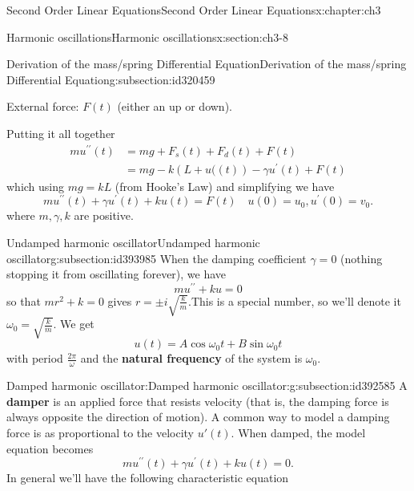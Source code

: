 \documentclass[oneside,10pt,]{book}
\newcommand{\terminology}[1]{\textbf{#1}}
\numberwithin{equation}{section}
\numberwithin{equation}{section}
\newcommand{\amp}{&}
\begin{document}
\begin{chapterptx}{Second Order Linear Equations}{}{Second Order Linear Equations}{}{}{x:chapter:ch3}
\begin{sectionptx}{Harmonic oscillations}{}{Harmonic oscillations}{}{}{x:section:ch3-8}
\begin{subsectionptx}{Derivation of the mass\slash{}spring Differential Equation}{}{Derivation of the mass\slash{}spring Differential Equation}{}{}{g:subsection:id320459}
\par
External force: \(F(t)\) (either an up or down).%
\par
Putting it all together%
\begin{align*}
mu^{\prime\prime}(t) \amp= mg+F_{s}(t)+F_{d}(t)+F(t) \\
\amp= mg-k\left(L+u((t)\right)-\gamma u^{\prime}(t)+F(t)
\end{align*}
which using \(mg=kL\) (from Hooke's Law) and simplifying we have%
\begin{equation*}
mu^{\prime\prime}(t)+\gamma u^{\prime}(t)+ku(t)=F(t)\,\,\,\,\,\,u(0)=u_{0},u^{\prime}(0)=v_{0}.
\end{equation*}
where \(m,\gamma,k\) are positive.%
\end{subsectionptx}
%
%
\typeout{************************************************}
\typeout{************************************************}
%
\begin{subsectionptx}{Undamped harmonic oscillator}{}{Undamped harmonic oscillator}{}{}{g:subsection:id393985}
When the damping coefficient \(\gamma=0\) (nothing stopping it from oscillating forever), we have%
\begin{equation*}
mu^{\prime\prime}+ku=0
\end{equation*}
so that \(mr^{2}+k=0\) gives \(r=\pm i\sqrt{\frac{k}{m}}.\)This is a special number, so we'll denote it \(\omega_{0}=\sqrt{\frac{k}{m}}.\) We get%
\begin{equation*}
u(t)=A\cos\omega_{0}t+B\sin\omega_{0}t
\end{equation*}
with period \(\frac{2\pi}{\omega}\) and the \terminology{natural frequency} of the system is \(\omega_{0}\).%
\end{subsectionptx}
%
%
\typeout{************************************************}
\typeout{************************************************}
%
\begin{subsectionptx}{Damped harmonic oscillator:}{}{Damped harmonic oscillator:}{}{}{g:subsection:id392585}
A \terminology{damper} is an applied force that resists velocity (that is, the damping force is always opposite the direction of motion). A common way to model a damping force is as proportional to the velocity \(u'(t)\). When damped, the model equation becomes%
\begin{equation*}
mu^{\prime\prime}(t)+\gamma u^{\prime}(t)+ku(t)=0.
\end{equation*}
In general we'll have the following characteristic equation%

\end{subsectionptx}
\end{sectionptx}
\end{chapterptx}
\end{document}
